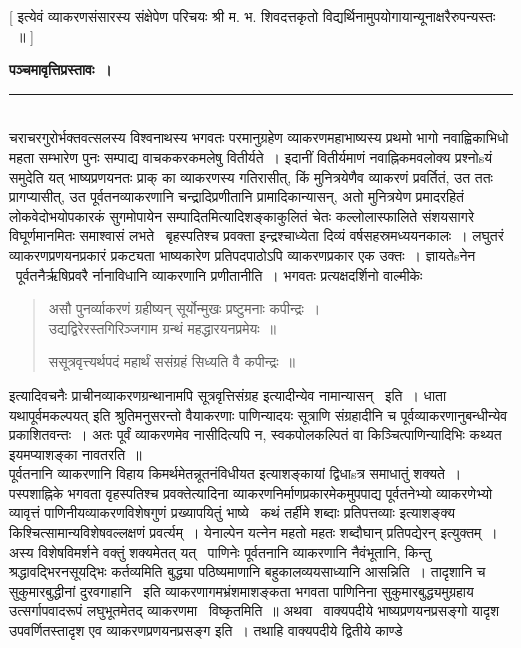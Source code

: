 \documentclass[11pt, openany]{book}
\begin{document}
 [ इत्येवं व्याकरणसंसारस्य संक्षेपेण परिचयः श्री म. भ. शिवदत्तकृतो विद्यर्थिनामुपयोगायान्यूनाक्षरैरुपन्यस्तः ~॥ ] 

\newpage
\thispagestyle{empty}
\begin{center}
\textbf{\Large पञ्चमावृत्तिप्रस्तावः~।}
\end{center}

\noindent
\rule{1\linewidth}{0.5pt}\\

चराचरगुरोर्भक्तवत्सलस्य विश्वनाथस्य भगवतः परमानुग्रहेण व्याकरणमहाभाष्यस्य प्रथमो भागो नवाह्विकाभिधो महता सम्भारेण पुनः सम्पाद्य वाचककरकमलेषु वितीर्यते~। इदानीं वितीर्यमाणं नवाह्निकमवलोक्य प्रश्नोsयं समुदेति यत् भाष्यप्रणयनतः प्राक् का व्याकरणस्य गतिरासीत्, किं मुनित्रयेणैव व्याकरणं प्रवर्तितं, उत ततः प्रागप्यासीत्, उत पूर्वतनव्याकरणानि चन्द्रादिप्रणीतानि प्रामादिकान्यासन्, अतो मुनित्रयेण प्रमादरहितं लोकवेदोभयोपकारकं सुगमोपायेन सम्पादितमित्यादिशङ्काकुलितं चेतः कल्लोलास्फालिते संशयसागरे विघूर्णमानमितः समाश्वासं लभते \textendash\ {\qt बृहस्पतिश्च प्रवक्ता इन्द्रश्चाध्येता दिव्यं वर्षसहस्रमध्ययनकालः}~। लघुतरं व्याकरणप्रणयनप्रकारं प्रकट्यता भाष्यकारेण प्रतिपदपाठोऽपि व्याकरणप्रकार एक उक्तः~। ज्ञायतेsनेन \textendash\ पूर्वतनैर्ऋषिप्रवरै र्नानाविधानि व्याकरणानि प्रणीतानीति~। भगवतः प्रत्यक्षदर्शिनो वाल्मीकेः \textendash\

\begin{quote}
{\qt असौ पुनर्व्याकरणं ग्रहीष्यन् सूर्योन्मुखः प्रष्टुमनाः कपीन्द्रः~।\\
उद्यद्विरेरस्तगिरिञ्जगाम ग्रन्थं महद्धारयनप्रमेयः~॥

ससूत्रवृत्त्यर्थपदं महार्थं ससंग्रहं सिध्यति वै कपीन्द्रः~॥}
\end{quote}

इत्यादिवचनैः प्राचीनव्याकरणग्रन्थानामपि सूत्रवृत्तिसंग्रह इत्यादीन्येव नामान्यासन् \textendash\ इति~। {\qt धाता यथापूर्वमकल्पयत्} इति श्रुतिमनुसरन्तो वैयाकरणाः पाणिन्यादयः सूत्राणि संग्रहादीनि च पूर्वव्याकरणानुबन्धीन्येव प्रकाशितवन्तः~। अतः पूर्वं व्याकरणमेव नासीदित्यपि न, स्वकपोलकल्पितं वा किञ्चित्पाणिन्यादिभिः कथ्यत इयमप्याशङ्का नावतरति~॥\\

पूर्वतनानि व्याकरणानि विहाय किमर्थमेतन्नूतनंविधीयत इत्याशङ्कायां द्विधाsत्र समाधातुं शक्यते~। पस्पशाह्निके भगवता वृहस्पतिश्च प्रवक्तेत्यादिना व्याकरणनिर्माणप्रकारमेकमुपपाद्य पूर्वतनेभ्यो व्याकरणेभ्यो व्यावृत्तं पाणिनीयव्याकरणविशेषगुणं प्रख्यापयितुं भाष्ये \textendash\ {\qt कथं तर्हीमे शब्दाः प्रतिपत्तव्याः} इत्याशङ्क्य {\qt किश्चित्सामान्यविशेषवल्लक्षणं प्रवर्त्यम्~। येनाल्पेन यत्नेन महतो महतः शब्दौघान् प्रतिपद्येरन्} इत्युक्तम्~। अस्य विशेषविमर्शने वक्तुं शक्यमेतत् यत् \textendash\ पाणिनेः पूर्वतनानि व्याकरणानि नैवंभूतानि, किन्तु श्रद्धावद्भिरनसूयद्भिः कर्तव्यमिति बुद्ध्या पठिष्यमाणानि बहुकालव्ययसाध्यानि आसन्निति~। तादृशानि च सुकुमारबुद्धीनां दुरवगाहानि \textendash\ इति व्याकरणागमभ्रंशमाशङ्कता भगवता पाणिनिना सुकुमारबुद्ध्यमुग्रहाय उत्सर्गापवादरूपं लघुभूतमेतद् व्याकरणमा \textendash\ विष्कृतमिति~॥ अथवा \textendash\ वाक्यपदीये भाष्यप्रणयनप्रसङ्गो यादृश उपवर्णितस्तादृश एव व्याकरणप्रणयनप्रसङ्ग इति~। तथाहि वाक्यपदीये द्वितीये काण्डे \textendash\
\end{document}
